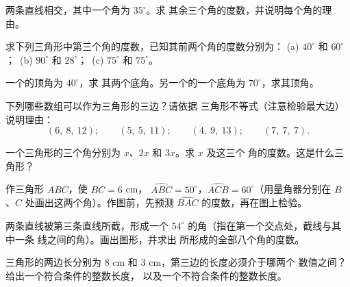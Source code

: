 \begin{exercise}[$\star$]\label{exo:g7:triangles:2}
两条直线相交，其中一个角为 $35^\circ$。求
其余三个角的度数，并说明每个角的理由。
\end{exercise}

\begin{exercise}[$\star$]\label{exo:g7:triangles:3}
求下列三角形中第三个角的度数，已知其前两个角的度数分别为：
(a) $40^\circ$ 和 $60^\circ$；\
(b) $90^\circ$ 和 $28^\circ$；\
(c) $75^\circ$ 和 $75^\circ$。
\end{exercise}

\begin{exercise}[$\star$]\label{exo:g7:triangles:4}
一个的顶角为 $40^\circ$，求
其两个底角。另一个\omterm{def:g6:shapes:triangles}{等腰三角形}的一个底角为
$70^\circ$，求其顶角。
\end{exercise}

\begin{exercise}[$\star$]\label{exo:g7:triangles:5}
下列哪些数组可以作为三角形的三边？请依据
三角形不等式（注意检验最大边）说明理由：
\[
(6,\ 8,\ 12); \qquad
(5,\ 5,\ 11); \qquad
(4,\ 9,\ 13); \qquad
(7,\ 7,\ 7).
\]
\end{exercise}

\begin{exercise}[$\star$]\label{exo:g7:triangles:6}
一个三角形的三个角分别为 $x$、$2x$ 和 $3x$。求 $x$ 及这三个
角的度数。这是什么三角形？
\end{exercise}

\begin{exercise}[$\star$]\label{exo:g7:triangles:7}
作三角形 $ABC$，使 $BC = 6$ cm，
$\widehat{ABC} = 50^\circ$，$\widehat{ACB} = 60^\circ$（用量角器分别在
$B$、$C$ 处画出这两个角）。作图前，先预测
$\widehat{BAC}$ 的度数，再在图上检验。
\end{exercise}

\begin{exercise}[$\star\star$]\label{exo:g7:triangles:8}
两条直线被第三条直线所截，形成一个
$54^\circ$ 的角（指在第一个交点处，截线与其中一条
\omterm{def:g6:lines:perp}{平行}线之间的角）。画出图形，并求出
所形成的全部八个角的度数。
\end{exercise}

\begin{exercise}[$\star\star$]\label{exo:g7:triangles:9}
三角形的两边长分别为 $8$ cm 和 $3$ cm，第三边的长度必须介于哪两个
数值之间？给出一个符合条件的整数长度，
以及一个不符合条件的整数长度。
\end{exercise}

